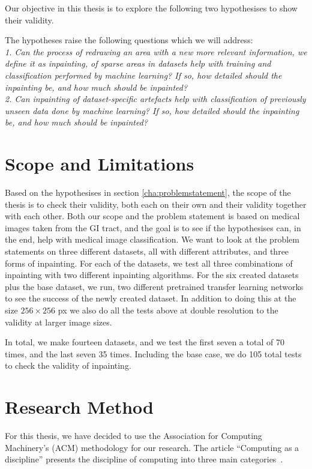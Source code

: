 Our objective in this thesis is to explore the following two hypothesises to show their validity.

The hypotheses raise the following questions which we will address:\\

\textit{1. Can the process of redrawing an area with a new more relevant information, we define it as inpainting, of sparse areas in datasets help with training and classification performed by machine learning? If so, how detailed should the inpainting be, and how much should be inpainted?}\\

\textit{2. Can inpainting of dataset-specific artefacts help with classification of previously unseen data done by machine learning? If so, how detailed should the inpainting be, and how much should be inpainted?}


\section{Scope and Limitations}
Based on the hypothesises in section \ref{cha:problemstatement}, the scope of the thesis is to check their validity, both each on their own and their validity together with each other. 
Both our scope and the problem statement is based on medical images taken from the GI tract, and the goal is to see if the hypothesises can, in the end, help with medical image classification.
We want to look at the problem statements on three different datasets, all with different attributes, and three forms of inpainting.
For each of the datasets, we test all three combinations of inpainting with two different inpainting algorithms. 
For the six created datasets plus the base dataset, we run, two different pretrained transfer learning networks to see the success of the newly created dataset.
In addition to doing this at the size $256 \times 256$ px we also do all the tests above at double resolution to the validity at larger image sizes.

In total, we make fourteen datasets, and we test the first seven a total of 70 times, and the last seven 35 times. Including the base case, we do 105 total tests to check the validity of inpainting.



\section{Research Method}
For this thesis, we have decided to use the Association for Computing Machinery's (ACM) methodology for our research. The article ``Computing as a discipline'' presents the discipline of computing into three main categories~\cite{Denning:1989:CD:63238.63239}. 
